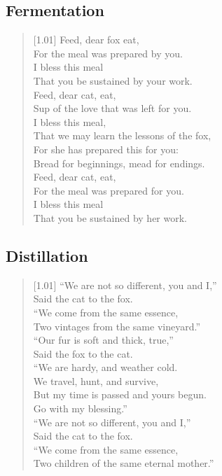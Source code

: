 \subsection{Fermentation}

\begin{verse}[1.01\textwidth]
Feed, dear fox eat,\\
\vin For the meal was prepared by you.\\
I bless this meal\\
\vin That you be sustained by your work.\\
Feed, dear cat, eat,\\
\vin Sup of the love that was left for you.\\
I bless this meal,\\
\vin That we may learn the lessons of the fox,\\
For she has prepared this for you:\\
\vin Bread for beginnings, mead for endings.\\
Feed, dear cat, eat,\\
\vin For the meal was prepared for you.\\
I bless this meal\\
\vin That you be sustained by her work.\\
\end{verse}
\newpage

\subsection{Distillation}

\begin{verse}[1.01\textwidth]
“We are not so different, you and I,”\\
\vin Said the cat to the fox.\\
“We come from the same essence,\\
\vin Two vintages from the same vineyard.”\\
“Our fur is soft and thick, true,”\\
\vin Said the fox to the cat.\\
“We are hardy, and weather cold.\\
\vin We travel, hunt, and survive,\\
But my time is passed and yours begun.\\
\vin Go with my blessing.”\\
“We are not so different, you and I,”\\
\vin Said the cat to the fox.\\
“We come from the same essence,\\
\vin Two children of the same eternal mother.”\\
\end{verse}
\newpage

